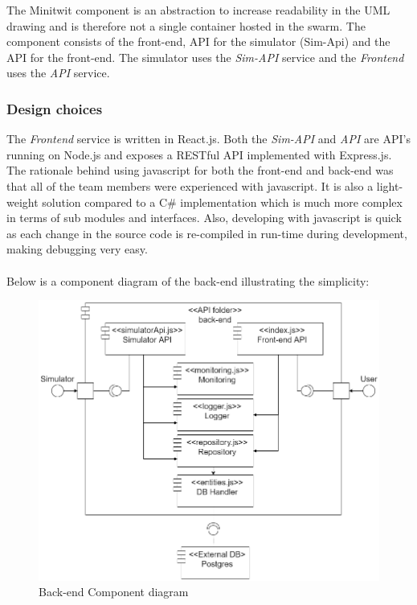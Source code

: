 The Minitwit component is an abstraction to increase readability in the UML drawing and is therefore not a single container hosted in the swarm. The component consists of the front-end, API for the simulator (Sim-Api) and the API for the front-end. The simulator uses the \textit{Sim-API} service and the \textit{Frontend} uses the \textit{API} service.

\subsubsection{Design choices}



The \textit{Frontend} service is written in React.js. Both the \textit{Sim-API} and \textit{API} are API's running on Node.js and exposes a RESTful API implemented with Express.js. \\
The rationale behind using javascript for both the front-end and back-end was that all of the team members were experienced with javascript. It is also a light-weight solution compared to a C\# implementation which is much more complex in terms of sub modules and interfaces. Also, developing with javascript is quick as each change in the source code is re-compiled in run-time during development, making debugging very easy.\\
\\
Below is a component diagram of the back-end illustrating the simplicity:

\begin{figure}[h!]
    \centering
    \includegraphics[width=1\linewidth]{report/images/component-diagram.png}
    \caption{Back-end Component diagram}
    \label{fig:back-end-component-diagram}
\end{figure}

